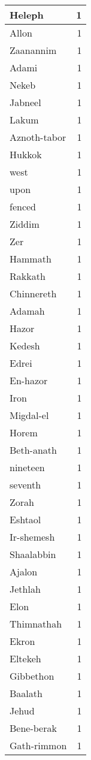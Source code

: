 \begin{center}
\begin{longtable}{l|r}
Heleph & 1\\ \hline 
Allon & 1\\ \hline 
Zaanannim & 1\\ \hline 
Adami & 1\\ \hline 
Nekeb & 1\\ \hline 
Jabneel & 1\\ \hline 
Lakum & 1\\ \hline 
Aznoth-tabor & 1\\ \hline 
Hukkok & 1\\ \hline 
west & 1\\ \hline 
upon & 1\\ \hline 
fenced & 1\\ \hline 
Ziddim & 1\\ \hline 
Zer & 1\\ \hline 
Hammath & 1\\ \hline 
Rakkath & 1\\ \hline 
Chinnereth & 1\\ \hline 
Adamah & 1\\ \hline 
Hazor & 1\\ \hline 
Kedesh & 1\\ \hline 
Edrei & 1\\ \hline 
En-hazor & 1\\ \hline 
Iron & 1\\ \hline 
Migdal-el & 1\\ \hline 
Horem & 1\\ \hline 
Beth-anath & 1\\ \hline 
nineteen & 1\\ \hline 
seventh & 1\\ \hline 
Zorah & 1\\ \hline 
Eshtaol & 1\\ \hline 
Ir-shemesh & 1\\ \hline 
Shaalabbin & 1\\ \hline 
Ajalon & 1\\ \hline 
Jethlah & 1\\ \hline 
Elon & 1\\ \hline 
Thimnathah & 1\\ \hline 
Ekron & 1\\ \hline 
Eltekeh & 1\\ \hline 
Gibbethon & 1\\ \hline 
Baalath & 1\\ \hline 
Jehud & 1\\ \hline 
Bene-berak & 1\\ \hline 
Gath-rimmon & 1\\ \hline 

\end{longtable}
\end{center}
